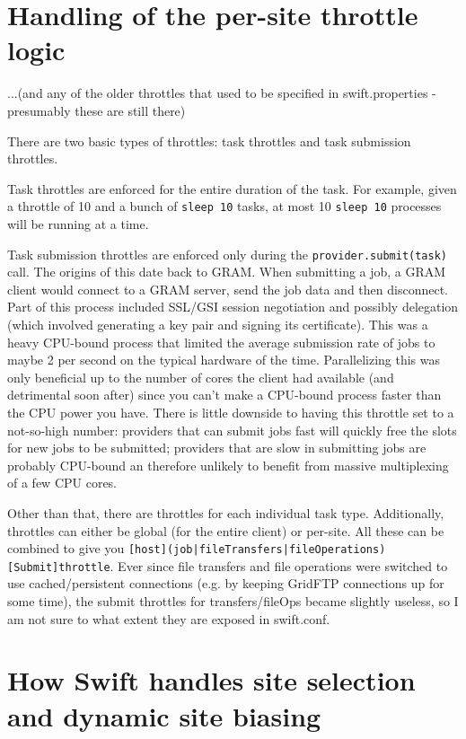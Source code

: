 \documentclass[12pt,letterpaper]{report}
\begin{document}
\section{Handling of the per-site throttle logic}
...(and any of the older throttles that used to be specified in swift.properties - presumably 
these are still there)

There are two basic types of throttles: task throttles and task submission throttles. 

Task throttles are enforced for the entire duration of the task. For example, given a throttle of 10 and a bunch of \texttt{sleep 10} tasks, at most 10 \texttt{sleep 10} processes will be running at a time.

Task submission throttles are enforced only during the \texttt{provider.submit(task)} call. The origins of this date back to GRAM. When submitting a job, a GRAM client would connect to a GRAM server, send the job data and then disconnect. Part of this process included SSL/GSI session negotiation and possibly delegation (which involved generating a key pair and signing its certificate). This was a heavy CPU-bound process that limited the average submission rate of jobs to maybe 2 per second on the typical hardware of the time. Parallelizing this was only beneficial up to the number of cores the client had available (and detrimental soon after) since you can't make a CPU-bound process faster than the CPU power you have. There is little downside to having this throttle set to a not-so-high number: providers that can submit jobs fast will quickly free the slots for new jobs to be submitted; providers that are slow in submitting jobs are probably CPU-bound an therefore unlikely to benefit from massive multiplexing of a few CPU cores.

Other than that, there are throttles for each individual task type. Additionally, throttles can either be global (for the entire client) or per-site. All these can be combined to give you \texttt{[host](job|fileTransfers|fileOperations)[Submit]throttle}. Ever since file transfers and file operations were switched to use cached/persistent connections (e.g. by keeping GridFTP connections up for some time), the submit throttles for transfers/fileOps became slightly useless, so I am not sure to what extent they are exposed in swift.conf.

\section{How Swift handles site selection and dynamic site biasing}
\end{document}
